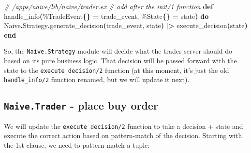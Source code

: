 \documentclass[
  oneside]{book}
\newenvironment{Shaded}{\begin{snugshade}}{\end{snugshade}}
\newcommand{\CommentTok}[1]{\textcolor[rgb]{0.56,0.35,0.01}{\textit{#1}}}
\newcommand{\ConstantTok}[1]{\textcolor[rgb]{0.56,0.35,0.01}{#1}}
\newcommand{\FunctionTok}[1]{\textcolor[rgb]{0.13,0.29,0.53}{\textbf{#1}}}
\newcommand{\KeywordTok}[1]{\textcolor[rgb]{0.13,0.29,0.53}{\textbf{#1}}}
\newcommand{\NormalTok}[1]{#1}
\newcommand{\OperatorTok}[1]{\textcolor[rgb]{0.81,0.36,0.00}{\textbf{#1}}}
\begin{document}
\begin{Shaded}
\begin{Highlighting}[]
\CommentTok{\# /apps/naive/lib/naive/trader.ex}
\CommentTok{\# add after the \textasciigrave{}init/1\textasciigrave{} function}
  \KeywordTok{def}\NormalTok{ handle\_info}\FunctionTok{(}\NormalTok{\%}\ConstantTok{TradeEvent}\FunctionTok{\{\}} \OperatorTok{=}\NormalTok{ trade\_event, \%}\ConstantTok{State}\FunctionTok{\{\}} \OperatorTok{=}\NormalTok{ state}\FunctionTok{)} \KeywordTok{do}
    \ConstantTok{Naive}\OperatorTok{.}\ConstantTok{Strategy}\OperatorTok{.}\NormalTok{generate\_decision}\FunctionTok{(}\NormalTok{trade\_event, state}\FunctionTok{)}
    \OperatorTok{|\textgreater{}}\NormalTok{ execute\_decision}\FunctionTok{(}\NormalTok{state}\FunctionTok{)}
  \KeywordTok{end}
\end{Highlighting}
\end{Shaded}

So, the \texttt{Naive.Strategy} module will decide what the trader server should do based on its pure business logic. That decision will be passed forward with the state to the \texttt{execute\_decision/2} function (at this moment, it's just the old \texttt{handle\_info/2} function renamed, but we will update it next).

\subsection{\texorpdfstring{\texttt{Naive.Trader} - place buy order}{Naive.Trader - place buy order}}\label{naive.trader---place-buy-order}

We will update the \texttt{execute\_decision/2} function to take a decision + state and execute the correct action based on pattern-match of the decision. Starting with the 1st clause, we need to pattern match a tuple:
\end{document}
